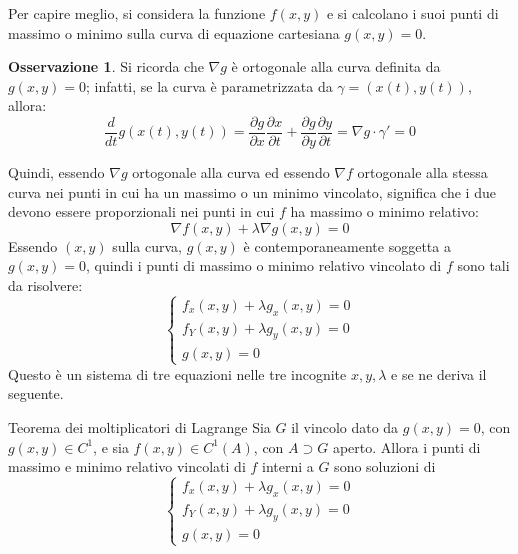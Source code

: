 \documentclass[10pt, a4paper]{scrartcl}
\theoremstyle{definition}
\numberwithin{esempio}{section}
\theoremstyle{definition}
\newtheorem{obs}{Osservazione}
\numberwithin{obs}{section}
\numberwithin{nota}{section}
\numberwithin{equation}{subsection}
\begin{document}
Per capire meglio, si considera la funzione $f(x,y)$ e si calcolano i suoi punti di massimo o minimo sulla curva di equazione cartesiana $g(x,y) =0 $.
\begin{obs}
	Si ricorda che $\nabla g$ \`e ortogonale alla curva definita da $g(x,y) = 0$; infatti, se la curva \`e parametrizzata da $\gamma=(x(t),y(t))$, allora:
	\[
	\frac{d }{d t} g(x(t),y(t)) = \frac{\partial g}{\partial x} \frac{\partial x}{\partial t} + \frac{\partial g}{\partial y} \frac{\partial y}{\partial t} = \nabla g \cdot \gamma' = 0
	\] 
\end{obs}
	Quindi, essendo $\nabla g$ ortogonale alla curva ed essendo $\nabla f$ ortogonale alla stessa curva nei punti in cui ha un massimo o un minimo vincolato, significa che i due devono essere proporzionali nei punti in cui $f$ ha massimo o minimo relativo:
	\[
	\nabla f(x,y) + \lambda \nabla g(x,y) = 0 
	\] 
Essendo $(x,y)$ sulla curva, $g(x,y)$ \`e contemporaneamente soggetta a $g(x,y) = 0$, quindi i punti di massimo o minimo relativo vincolato di $f$ sono tali da risolvere:
\begin{equation}
	\begin{cases}
		f_x(x,y) + \lambda g_x(x,y) = 0 \\
		f_Y(x,y) + \lambda g_y(x,y) =0\\
		g(x,y) = 0
	\end{cases}
\end{equation}
Questo \`e un sistema di tre equazioni nelle tre incognite $x,y,\lambda $ e se ne deriva il seguente.
\begin{teorema}
	{Teorema dei moltiplicatori di Lagrange}{}
	Sia $G$ il vincolo dato da $g(x,y) = 0$, con $g(x,y) \in C^1$, e sia $f(x,y)\in C^1(A)$, con $A \supset G$ aperto. 
	Allora i punti di massimo e minimo relativo vincolati di $f$ interni a $G$ sono soluzioni di
	\[
	\begin{cases}
		f_x(x,y) + \lambda g_x(x,y) = 0 \\
		f_Y(x,y) + \lambda g_y(x,y) =0\\
		g(x,y) = 0
	\end{cases}
	\] 
\end{teorema}
\end{document}
